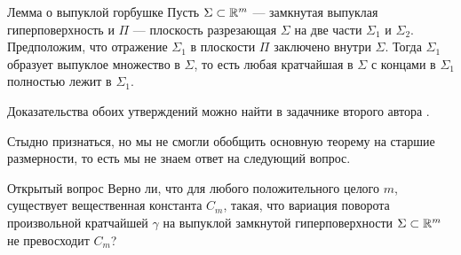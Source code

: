 \documentclass[a4paper,10pt]{article}
\begin{document}
\begin{thm}{Лемма о выпуклой горбушке}
Пусть $\Sigma\subset\mathbb{R}^m$ --- замкнутая выпуклая гиперповерхность и
$\Pi$ --- плоскость разрезающая $\Sigma$ на две части $\Sigma_1$ и $\Sigma_2$.
Предположим, что отражение $\Sigma_1$ в плоскости $\Pi$ заключено внутри  $\Sigma$.
Тогда $\Sigma_1$ образует выпуклое множество в $\Sigma$,
то есть любая кратчайшая в $\Sigma$ с концами в $\Sigma_1$ полностью лежит в $\Sigma_1$.
\end{thm}

Доказательства обоих утверждений можно найти в задачнике второго автора \cite{petrunin-orthodox}.

\medskip

Стыдно признаться, но мы не смогли обобщить основную теорему на старшие размерности,
то есть мы не знаем ответ на следующий вопрос.

\begin{thm}{Открытый вопрос}
Верно ли, что для любого положительного целого $m$,
существует вещественная константа $C_m$,
такая, что вариация поворота произвольной кратчайшей $\gamma$ на выпуклой замкнутой гиперповерхности $\Sigma\subset\mathbb{R}^m$ не превосходит $C_m$?
\end{thm}







\end{document}
